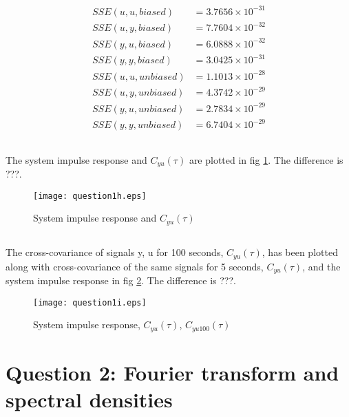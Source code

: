 \documentclass[times,12pt,reqno]{amsart}
\begin{document}
\begin{align*}
    SSE(u, u, biased) &= 3.7656 \times 10^{-31} \\
    SSE(u, y, biased) &= 7.7604 \times 10^{-32} \\
    SSE(y, u, biased) &= 6.0888 \times 10^{-32} \\
    SSE(y, y, biased) &= 3.0425 \times 10^{-31} \\
    SSE(u, u, unbiased) &= 1.1013 \times 10^{-28} \\
    SSE(u, y, unbiased) &= 4.3742 \times 10^{-29} \\
    SSE(y, u, unbiased) &= 2.7834 \times 10^{-29} \\
    SSE(y, y, unbiased) &= 6.7404 \times 10^{-29}
\end{align*}

\subsection{}
The system impulse response and $C_{yu}(\tau)$ are plotted in fig \ref{fig:q1h}.
The difference is ???.

\begin{figure}[H]
    \begin{center}
        \texttt{[image: question1h.eps]}
    \end{center}
    \caption{System impulse response and $C_{yu}(\tau)$}
    \label{fig:q1h}
\end{figure}

\subsection{}
The cross-covariance of signals y, u for 100 seconds, $C_{yu}(\tau)$, has been
plotted along with cross-covariance of the same signals for 5 seconds,
$C_{yu}(\tau)$, and the system impulse response in fig \ref{fig:q1i}. The
difference is ???.

\begin{figure}[H]
    \begin{center}
        \texttt{[image: question1i.eps]}
    \end{center}
    \caption{System impulse response, $C_{yu}(\tau)$, $C_{yu100}(\tau)$}
    \label{fig:q1i}
\end{figure}

\newpage
\section{Question 2: Fourier transform and spectral densities}
\end{document}
